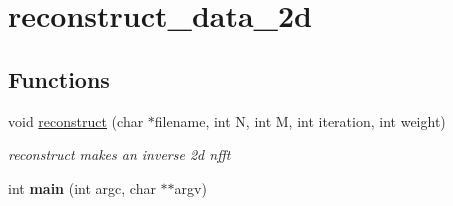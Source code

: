\hypertarget{group__applications__mri2d__reconstruct__data__2d}{
\section{reconstruct\_\-data\_\-2d}
\label{group__applications__mri2d__reconstruct__data__2d}
}
\subsection*{Functions}
\begin{CompactItemize}
\item 
\hypertarget{group__applications__mri2d__reconstruct__data__2d_ga0}{
void \hyperlink{group__applications__mri2d__reconstruct__data__2d_ga0}{reconstruct} (char $\ast$filename, int N, int M, int iteration, int weight)}
\label{group__applications__mri2d__reconstruct__data__2d_ga0}

\begin{CompactList}\small\item\em reconstruct makes an inverse 2d nfft \item\end{CompactList}\item 
\hypertarget{group__applications__mri2d__reconstruct__data__2d_ga1}{
int {\bf main} (int argc, char $\ast$$\ast$argv)}
\label{group__applications__mri2d__reconstruct__data__2d_ga1}

\end{CompactItemize}
